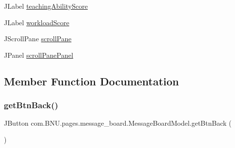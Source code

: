 \begin{DoxyCompactItemize}
J\+Label \mbox{\hyperlink{classcom_1_1_b_n_u_1_1pages_1_1message__board_1_1_message_board_model_a4843957afdd3ed49451502d67d362dc6}{teaching\+Ability\+Score}}
\item 
J\+Label \mbox{\hyperlink{classcom_1_1_b_n_u_1_1pages_1_1message__board_1_1_message_board_model_a0d58f0465c95d3fd98896e4e28e6736b}{workload\+Score}}
\item 
J\+Scroll\+Pane \mbox{\hyperlink{classcom_1_1_b_n_u_1_1pages_1_1message__board_1_1_message_board_model_a4101feff8026b83b57dfc1d3c16f0289}{scroll\+Pane}}
\item 
J\+Panel \mbox{\hyperlink{classcom_1_1_b_n_u_1_1pages_1_1message__board_1_1_message_board_model_a6cc0aa276013270c9164290acd5a2dd8}{scroll\+Pane\+Panel}}
\end{DoxyCompactItemize}


\subsection{Member Function Documentation}
\mbox{\label{classcom_1_1_b_n_u_1_1pages_1_1message__board_1_1_message_board_model_adb7d4a854d61fe5c28860ba6fb6ec89d}} 
\subsubsection{\texorpdfstring{get\+Btn\+Back()}{getBtnBack()}}
{\footnotesize\ttfamily J\+Button com.\+B\+N\+U.\+pages.\+message\+\_\+board.\+Message\+Board\+Model.\+get\+Btn\+Back (\begin{DoxyParamCaption}{ }\end{DoxyParamCaption})}

\mbox{\label{classcom_1_1_b_n_u_1_1pages_1_1message__board_1_1_message_board_model_ac09d93260f88cba63cba508993d3aed9}} 
